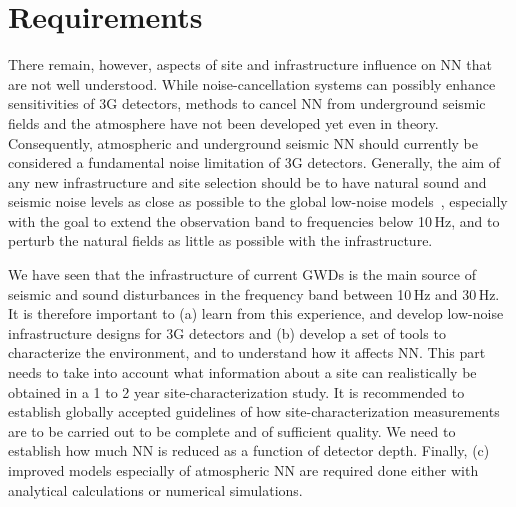 \section{Requirements}
There remain, however, aspects of site and infrastructure influence on \ac{NN} that are not well understood. 
While noise-cancellation systems can possibly enhance sensitivities of \ac{3G} detectors, methods to cancel \ac{NN} from underground seismic fields and the atmosphere have not been developed yet even in theory. Consequently, atmospheric and underground seismic \ac{NN} should currently be considered a fundamental noise limitation of \ac{3G} detectors. Generally, the aim of any new infrastructure and site selection should be to have natural sound and seismic noise levels as close as possible to the global low-noise models~\cite{Pet1993}, especially with the goal to extend the observation band to frequencies below 10\,Hz, and to perturb the natural fields as little as possible with the infrastructure. 

We have seen that the infrastructure of current \acp{GWD} is the main source of seismic and sound disturbances in the frequency band between 10\,Hz and 30\,Hz. It is therefore important to (a) learn from this experience, and develop low-noise infrastructure designs for \ac{3G} detectors %
and (b) 
develop a set of tools to characterize the environment, and to understand how it affects \ac{NN}. This part needs to take into account what information about a site can realistically be obtained in a 1 to 2 year site-characterization study. It is recommended to establish globally accepted guidelines of how site-characterization measurements are to be carried out to be complete and of sufficient quality. We need to establish how much \ac{NN} is reduced as a function of detector depth. Finally, (c) improved models especially of atmospheric \ac{NN} are required done either with analytical calculations or numerical simulations.

